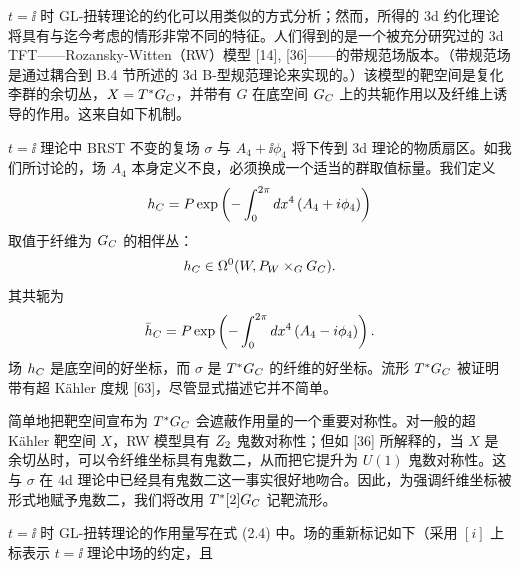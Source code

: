 $t=\ii$ 时 GL-扭转理论的约化可以用类似的方式分析；然而，所得的 3d 约化理论将具有与迄今考虑的情形非常不同的特征。人们得到的是一个被充分研究过的 3d TFT——Rozansky-Witten（RW）模型 [14], [36]——的带规范场版本。（带规范场是通过耦合到 B.4 节所述的 3d B-型规范理论来实现的。）该模型的靶空间是复化李群的余切丛，$X=T^*G_{C}$，并带有 $G$ 在底空间 $G_{C}$ 上的共轭作用以及纤维上诱导的作用。这来自如下机制。

$t=\ii$ 理论中 BRST 不变的复场 $\sigma$ 与 $A_4+\ii\phi_4$ 将下传到 3d 理论的物质扇区。如我们所讨论的，场 $A_4$ 本身定义不良，必须换成一个适当的群取值标量。我们定义
\[
    h_{C} = P\exp\left(-\int_0^{2\pi}d x^4\left(A_4+i\phi_4\right)\right)
\]
取值于纤维为 $G_{C}$ 的相伴丛：
\[
    h_{C} \in \Omega^0(W, P_W\times_G G_{C}) .
\]
其共轭为
\[
    \bar h_{C} = P\exp\left(-\int_0^{2\pi}d x^4\left(A_4-i\phi_4\right)\right) .
\]
场 $h_{C}$ 是底空间的好坐标，而 $\sigma$ 是 $T^*G_{C}$ 的纤维的好坐标。流形 $T^*G_{C}$ 被证明带有超 Kähler 度规 [63]，尽管显式描述它并不简单。


简单地把靶空间宣布为 $T^*G_{C}$ 会遮蔽作用量的一个重要对称性。对一般的超 Kähler 靶空间 $X$，RW 模型具有 $Z_2$ 鬼数对称性；但如 [36] 所解释的，当 $X$ 是余切丛时，可以令纤维坐标具有鬼数二，从而把它提升为 $U(1)$ 鬼数对称性。这与 $\sigma$ 在 4d 理论中已经具有鬼数二这一事实很好地吻合。因此，为强调纤维坐标被形式地赋予鬼数二，我们将改用 $T^*[2]G_{C}$ 记靶流形。

$t=\ii$ 时 GL-扭转理论的作用量写在式 (2.4) 中。场的重新标记如下（采用 $[i]$ 上标表示 $t=\ii$ 理论中场的约定，且
